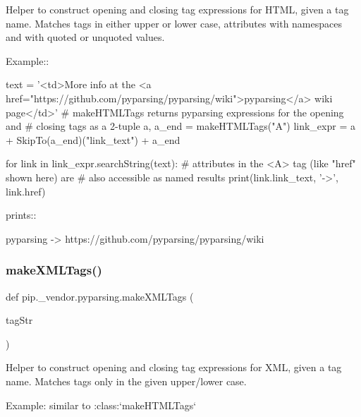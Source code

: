 \begin{DoxyVerb}Helper to construct opening and closing tag expressions for HTML,
given a tag name. Matches tags in either upper or lower case,
attributes with namespaces and with quoted or unquoted values.

Example::

    text = '<td>More info at the <a href="https://github.com/pyparsing/pyparsing/wiki">pyparsing</a> wiki page</td>'
    # makeHTMLTags returns pyparsing expressions for the opening and
    # closing tags as a 2-tuple
    a, a_end = makeHTMLTags("A")
    link_expr = a + SkipTo(a_end)("link_text") + a_end

    for link in link_expr.searchString(text):
        # attributes in the <A> tag (like "href" shown here) are
        # also accessible as named results
        print(link.link_text, '->', link.href)

prints::

    pyparsing -> https://github.com/pyparsing/pyparsing/wiki
\end{DoxyVerb}
 \mbox{\label{namespacepip_1_1__vendor_1_1pyparsing_aa2a2a7f2b621b5d2a3835c55b7b671a5}} 
\subsubsection{\texorpdfstring{make\+X\+M\+L\+Tags()}{makeXMLTags()}}
{\footnotesize\ttfamily def pip.\+\_\+vendor.\+pyparsing.\+make\+X\+M\+L\+Tags (\begin{DoxyParamCaption}\item[{}]{tag\+Str }\end{DoxyParamCaption})}

\begin{DoxyVerb}Helper to construct opening and closing tag expressions for XML,
given a tag name. Matches tags only in the given upper/lower case.

Example: similar to :class:`makeHTMLTags`
\end{DoxyVerb}
 \mbox{\label{namespacepip_1_1__vendor_1_1pyparsing_a84aec549d8c4828a4a01d03849a1a876}} 
